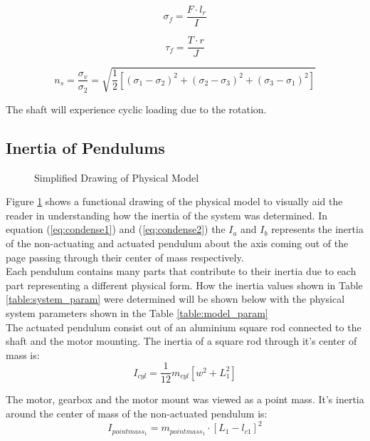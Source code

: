 \begin{equation} \label{eq:axialForce}
\sigma_{f} = \frac{F\cdot l_{r}}{I}
\end{equation}

\begin{equation} \label{eq:torsionForce}
\tau_{f} = \frac{T\cdot r}{J}
\end{equation}


\begin{equation} \label{eq:vonMises}
n_{s} = \frac{\sigma_{v}}{\sigma_{2}} = \sqrt{\frac{1}{2}[(\sigma_{1}-\sigma_{2})^2+(\sigma_{2}-\sigma_{3})^2 + (\sigma_{3}-\sigma_{1})^2 ]}
\end{equation}


The shaft will experience cyclic loading due to the rotation.

\subsection{Inertia of Pendulums}
\begin{figure}[h]
	\centering
	
	\caption{Simplified Drawing of Physical Model}
	\label{fig:model_drawing}
\end{figure}

Figure \ref{fig:model_drawing} shows a functional drawing of the physical model to visually aid the reader in understanding how the inertia of the system was determined. In equation (\ref{eq:condense1}) and (\ref{eq:condense2}) the $I_{a}$ and $I_{b}$ represents the inertia of the non-actuating and actuated pendulum about the axis coming out of the page passing through their center of mass respectively.\\

Each pendulum contains many parts that contribute to their inertia due to each part representing a different physical form. How the inertia values shown in Table \ref{table:system_param} were determined will be shown below with the physical system parameters shown in the Table \ref{table:model_param}\\

The actuated pendulum consist out of an aluminium square rod connected to the shaft and the motor mounting. The inertia of a square rod through it's center of mass is: $$ I_{cyl} = \frac{1}{12}m_{cyl}[w^2+L^2_{1}]$$

The motor, gearbox and the motor mount was viewed as a point mass. It's inertia around the center of mass of the non-actuated pendulum is: $$I_{pointmass_1} = m_{pointmass_1}\cdot[L_{1}-l_{c1}]^2 $$

